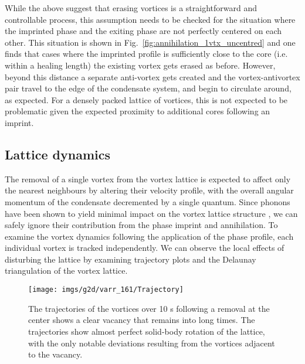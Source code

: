 While the above suggest that erasing vortices is a straightforward and controllable process, this assumption needs to be checked for the situation where the imprinted phase and the exiting phase are not perfectly centered on each other.
This situation is shown in Fig.~\ref{fig:annihilation_1vtx_uncentred} and one finds that cases where the imprinted profile is sufficiently close to the core (i.e. within a healing length) the existing vortex gets erased as before. However, beyond this distance a separate anti-vortex gets created and the vortex-antivortex pair travel to the edge of the condensate system, and begin to circulate around, as expected. For a densely packed lattice of vortices, this is not expected to be problematic given the expected proximity to additional cores following an imprint. %

\subsection{Lattice dynamics}

The removal of a single vortex from the vortex lattice is expected to affect only the nearest neighbours by altering their velocity profile, with the overall angular momentum of the condensate decremented by a single quantum. Since phonons have been shown to yield minimal impact on the vortex lattice structure \cite{VTX:oriordan_pra_2016}, we can safely ignore their contribution from the phase imprint and annihilation. To examine the vortex dynamics following the application of the phase profile, each individual vortex is tracked independently. We can observe the local effects of disturbing the lattice by examining trajectory plots and the Delaunay triangulation of the vortex lattice.

\begin{figure}
    \texttt{[image: imgs/g2d/varr\_161/Trajectory]}
    \caption{The trajectories of the vortices over 10 s following a removal at the center shows a clear vacancy that remains into long times. The trajectories show almost perfect solid-body rotation of the lattice, with the only notable deviations resulting from the vortices adjacent to the vacancy.}
    \label{fig:trajplot}
\end{figure}

